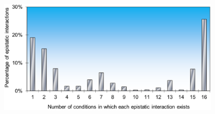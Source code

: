 \documentclass{article}
\begin{document}
\begin{figure}[H]
\caption{}
\label{fig:eefS4}
\centering
\includegraphics[width=\textwidth]{envFigure_S4}
\end{figure}
\end{document}
